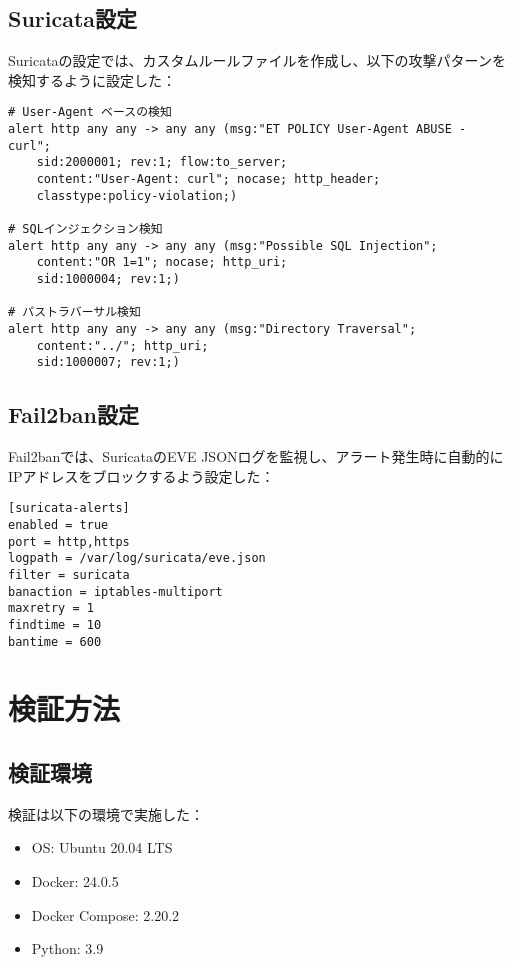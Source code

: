 \documentclass[12pt,a4paper]{article}
\begin{document}
\subsection{Suricata設定}

Suricataの設定では、カスタムルールファイルを作成し、以下の攻撃パターンを検知するように設定した：

\begin{lstlisting}[caption=local.rules（検知ルール抜粋）]
# User-Agent ベースの検知
alert http any any -> any any (msg:"ET POLICY User-Agent ABUSE - curl"; 
    sid:2000001; rev:1; flow:to_server; 
    content:"User-Agent: curl"; nocase; http_header; 
    classtype:policy-violation;)

# SQLインジェクション検知
alert http any any -> any any (msg:"Possible SQL Injection"; 
    content:"OR 1=1"; nocase; http_uri; 
    sid:1000004; rev:1;)

# パストラバーサル検知
alert http any any -> any any (msg:"Directory Traversal"; 
    content:"../"; http_uri; 
    sid:1000007; rev:1;)
\end{lstlisting}

\subsection{Fail2ban設定}

Fail2banでは、SuricataのEVE JSONログを監視し、アラート発生時に自動的にIPアドレスをブロックするよう設定した：

\begin{lstlisting}[caption=jail.local（Fail2ban設定抜粋）]
[suricata-alerts]
enabled = true
port = http,https
logpath = /var/log/suricata/eve.json
filter = suricata
banaction = iptables-multiport
maxretry = 1
findtime = 10
bantime = 600
\end{lstlisting}

\section{検証方法}

\subsection{検証環境}
検証は以下の環境で実施した：
\begin{itemize}
    \item OS: Ubuntu 20.04 LTS
    \item Docker: 24.0.5
    \item Docker Compose: 2.20.2
    \item Python: 3.9
\end{itemize}
\end{document}
